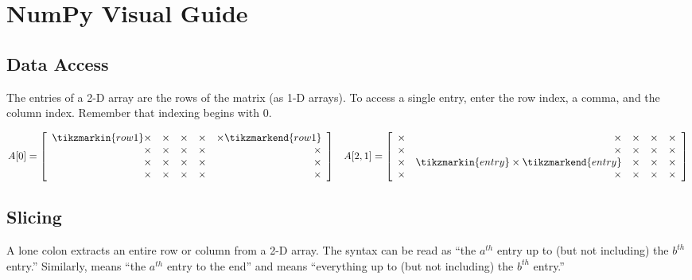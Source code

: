 \newpage

\section*{NumPy Visual Guide} %

\subsection*{Data Access} %

The entries of a 2-D array are the rows of the matrix (as 1-D arrays).
To access a single entry, enter the row index, a comma, and the column index.
Remember that indexing begins with $0$.

\begin{align*}
A[0] = \left[\begin{array}{rrrrr}
\tikzmarkin{row1}\times & \times & \times & \times & \times\tikzmarkend{row1}\\
\times & \times & \times & \times & \times\\
\times & \times & \times & \times & \times\\
\times & \times & \times & \times & \times\\
\end{array}\right]
&&
A[2,1] = \left[\begin{array}{rrrrr}
\times & \times & \times & \times & \times\\
\times & \times & \times & \times & \times\\
\times & \tikzmarkin{entry} \times \tikzmarkend{entry} & \times & \times & \times\\
\times & \times & \times & \times & \times
\end{array}\right]
\end{align*}

\subsection*{Slicing} %

A lone colon extracts an entire row or column from a 2-D array.
The syntax \li{[a:b]} can be read as ``the $a^{th}$ entry up to (but not including) the $b^{th}$ entry.''
Similarly, \li{[a:]} means ``the $a^{th}$ entry to the end'' and \li{[:b]} means ``everything up to (but not including) the $b^{th}$ entry.''

